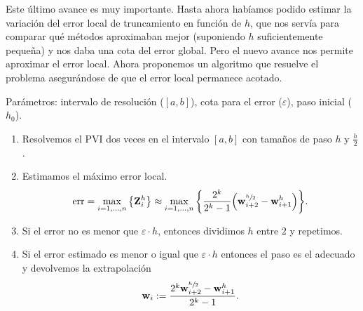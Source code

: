 
Este último avance es muy importante.
Hasta ahora habíamos podido estimar
la variación del error local de truncamiento en función de $h$,
que nos servía para comparar qué métodos aproximaban mejor
(suponiendo $h$ suficientemente pequeña)
y nos daba una cota del error global.
Pero el nuevo avance nos permite aproximar el error local.
Ahora proponemos un algoritmo que resuelve el problema
asegurándose de que el error local permanece acotado.

\begin{definition}
    Parámetros:
    intervalo de resolución (\/$[a, b]$),
    cota para el error (\/$\varepsilon$),
    paso inicial (\/$h_0$).

    \begin{enumerate}
        \item Resolvemos el PVI dos veces en el intervalo $[a, b]$
        con tamaños de paso $h$ y $\frac{h}{2}$.
        \item Estimamos el máximo error local.
        \begin{equation*}
            \operatorname{err} = \max_{i = 1,\ldots,n}\qty{\vb{Z}{}^h_i} \approx
            \max_{i = 1,\ldots,n}\qty{
                \frac{2^k}{2^k-1}\qty(\vb{w}{}^{\sfrac{h}{2}}_{i+2} - \vb{w}{}^h_{i+1})
            }.
        \end{equation*}
        \item Si el error no es menor que $\varepsilon\cdot h$,
        entonces dividimos $h$ entre $2$ y repetimos.
        \item Si el error estimado es menor o igual que $\varepsilon \cdot h$
        entonces el paso es el adecuado y
        devolvemos la extrapolación
        \begin{equation*}
            \vb{w}{}_i := \frac{2^k\vb{w}{}^{\sfrac{h}{2}}_{i+2} - \vb{w}{}^h_{i+1}}{2^k - 1}.
        \end{equation*}
    \end{enumerate}
\end{definition}

